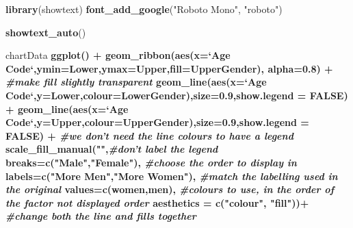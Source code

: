 \documentclass[]{article}
\newenvironment{Shaded}{\begin{snugshade}}{\end{snugshade}}
\newcommand{\KeywordTok}[1]{\textcolor[rgb]{0.13,0.29,0.53}{\textbf{#1}}}
\newcommand{\DataTypeTok}[1]{\textcolor[rgb]{0.13,0.29,0.53}{#1}}
\newcommand{\DecValTok}[1]{\textcolor[rgb]{0.00,0.00,0.81}{#1}}
\newcommand{\FloatTok}[1]{\textcolor[rgb]{0.00,0.00,0.81}{#1}}
\newcommand{\StringTok}[1]{\textcolor[rgb]{0.31,0.60,0.02}{#1}}
\newcommand{\CommentTok}[1]{\textcolor[rgb]{0.56,0.35,0.01}{\textit{#1}}}
\newcommand{\OtherTok}[1]{\textcolor[rgb]{0.56,0.35,0.01}{#1}}
\newcommand{\OperatorTok}[1]{\textcolor[rgb]{0.81,0.36,0.00}{\textbf{#1}}}
\newcommand{\NormalTok}[1]{#1}
\begin{document}
\begin{Shaded}
\begin{Highlighting}[]
\KeywordTok{library}\NormalTok{(showtext)}
\KeywordTok{font_add_google}\NormalTok{(}\StringTok{"Roboto Mono"}\NormalTok{, }\StringTok{"roboto"}\NormalTok{)}



\KeywordTok{showtext_auto}\NormalTok{()}

\NormalTok{chartData }\OperatorTok{%>%}\StringTok{ }\KeywordTok{filter}\NormalTok{(Year}\OperatorTok{==}\DecValTok{2014}\NormalTok{) }\OperatorTok{%>%}
\StringTok{  }\KeywordTok{ggplot}\NormalTok{() }\OperatorTok{+}
\StringTok{  }\KeywordTok{geom_ribbon}\NormalTok{(}\KeywordTok{aes}\NormalTok{(}\DataTypeTok{x=}\StringTok{`}\DataTypeTok{Age Code}\StringTok{`}\NormalTok{,}\DataTypeTok{ymin=}\NormalTok{Lower,}\DataTypeTok{ymax=}\NormalTok{Upper,}\DataTypeTok{fill=}\NormalTok{UpperGender),}
              \DataTypeTok{alpha=}\FloatTok{0.8}\NormalTok{) }\OperatorTok{+}\StringTok{ }\CommentTok{#make fill slightly transparent}
\StringTok{  }\KeywordTok{geom_line}\NormalTok{(}\KeywordTok{aes}\NormalTok{(}\DataTypeTok{x=}\StringTok{`}\DataTypeTok{Age Code}\StringTok{`}\NormalTok{,}\DataTypeTok{y=}\NormalTok{Lower,}\DataTypeTok{colour=}\NormalTok{LowerGender),}\DataTypeTok{size=}\FloatTok{0.9}\NormalTok{,}\DataTypeTok{show.legend =} \OtherTok{FALSE}\NormalTok{) }\OperatorTok{+}\StringTok{ }
\StringTok{  }\KeywordTok{geom_line}\NormalTok{(}\KeywordTok{aes}\NormalTok{(}\DataTypeTok{x=}\StringTok{`}\DataTypeTok{Age Code}\StringTok{`}\NormalTok{,}\DataTypeTok{y=}\NormalTok{Upper,}\DataTypeTok{colour=}\NormalTok{UpperGender),}\DataTypeTok{size=}\FloatTok{0.9}\NormalTok{,}\DataTypeTok{show.legend =} \OtherTok{FALSE}\NormalTok{) }\OperatorTok{+}\StringTok{ }\CommentTok{#we don't need the line colours to have a legend}
\StringTok{  }\KeywordTok{scale_fill_manual}\NormalTok{(}\StringTok{""}\NormalTok{,}\CommentTok{#don't label the legend}
                    \DataTypeTok{breaks=}\KeywordTok{c}\NormalTok{(}\StringTok{"Male"}\NormalTok{,}\StringTok{"Female"}\NormalTok{), }\CommentTok{#choose the order to display in }
                    \DataTypeTok{labels=}\KeywordTok{c}\NormalTok{(}\StringTok{"More Men"}\NormalTok{,}\StringTok{"More Women"}\NormalTok{), }\CommentTok{#match the labelling used in the original}
                    \DataTypeTok{values=}\KeywordTok{c}\NormalTok{(women,men), }\CommentTok{#colours to use, in the order of the factor not displayed order}
                    \DataTypeTok{aesthetics =} \KeywordTok{c}\NormalTok{(}\StringTok{"colour"}\NormalTok{, }\StringTok{"fill"}\NormalTok{))}\OperatorTok{+}\StringTok{ }\CommentTok{#change both the line and fills together}
}
\end{Highlighting}
\end{Shaded}
\end{document}
